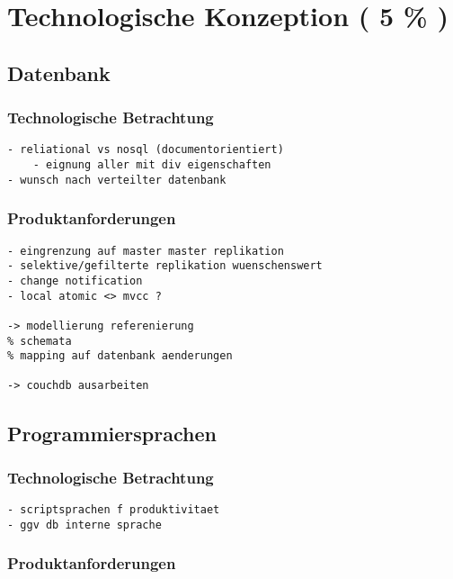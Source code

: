 \chapter{Technologische Konzeption ( 5 \% )}





\section{Datenbank}
\subsection{Technologische Betrachtung}

\begin{verbatim}
- reliational vs nosql (documentorientiert)
    - eignung aller mit div eigenschaften
- wunsch nach verteilter datenbank
\end{verbatim}

\subsection{Produktanforderungen}

\begin{verbatim}
- eingrenzung auf master master replikation
- selektive/gefilterte replikation wuenschenswert
- change notification
- local atomic <> mvcc ?

-> modellierung referenierung
% schemata
% mapping auf datenbank aenderungen

-> couchdb ausarbeiten

\end{verbatim}


\section{Programmiersprachen}
\subsection{Technologische Betrachtung}

\begin{verbatim}
- scriptsprachen f produktivitaet
- ggv db interne sprache
\end{verbatim}

\subsection{Produktanforderungen}


